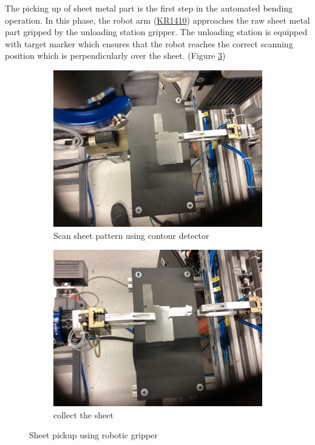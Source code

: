 The picking up of sheet metal part is the first step in the automated bending operation. In this phase, the robot arm (\hyperref[acro:KR]{KR1410}) approaches the raw sheet metal part gripped by the unloading station gripper. The unloading station is equipped with target marker which ensures that the robot reaches the correct scanning position which is perpendicularly over the sheet. (Figure \ref{fig:sheet-pickup})


\begin{figure}[h]
    \centering
    \begin{subfigure}[b]{0.48\textwidth}
        \centering
        \includegraphics[width=\textwidth]{figures/sheet-pickup/scan.png}
        \caption{Scan sheet pattern using contour detector}
        \label{subfig:sheet-scan}
    \end{subfigure}\hspace{0.1cm}
    \begin{subfigure}[b]{0.48\textwidth}
        \centering
        \includegraphics[width=\textwidth]{figures/sheet-pickup/taken.png}
        \caption{collect the sheet}
        \label{subfig:sheet-taken}
    \end{subfigure}
    \caption{Sheet pickup using robotic gripper}
    \label{fig:sheet-pickup}
\end{figure}


